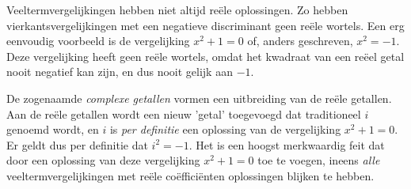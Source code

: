 \documentclass{ximera}
\begin{document}
	\author{Zomercursus KU Leuven}
	
	\label{xim:complexe_getallen}
    
Veeltermvergelijkingen hebben niet altijd reële oplossingen. Zo hebben vierkantsvergelijkingen met een negatieve discriminant geen reële wortels. Een erg eenvoudig voorbeeld is de vergelijking $x^2+1=0$ of, anders geschreven, $x^2=-1$. Deze vergelijking heeft geen reële wortels, omdat het kwadraat van een reëel getal nooit negatief kan zijn, en dus nooit gelijk aan $-1$. 

De zogenaamde \textit{complexe getallen} vormen een uitbreiding van de reële getallen. Aan de reële getallen wordt een nieuw 'getal' toegevoegd dat traditioneel $i$ genoemd wordt, en $i$ is \textit{per definitie} een oplossing van de vergelijking $x^2+1=0$. Er geldt dus per definitie dat $i^2=-1$. Het is een hoogst merkwaardig feit dat door een oplossing van deze vergelijking $x^2+1=0$ toe te voegen, ineens \textit{alle} veeltermvergelijkingen met reële coëfficiënten oplossingen blijken te hebben.
\end{document}
